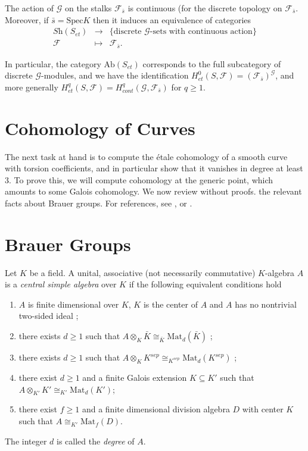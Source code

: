 \begin{theorem}
The action of $\mathcal{G}$ on the stalks $\mathcal{F}_{\bar s}$ is continuous 
(for the discrete topology on $\mathcal{F}_{\bar s}$. Moreover, if $\bar s= 
\text{Spec} K$ then it induces an equivalence of categories
$$
\begin{array}{rcl}
\textit{Sh}(S_{et}) & \longrightarrow & \{ \text{discrete $\mathcal{G}$-sets 
with continuous action} \} \\
\mathcal{F} & \longmapsto & \mathcal{F}_{\bar s}.
\end{array}
$$
\end{theorem}

\noindent
In particular, the category $\text{Ab}(S_{et})$ corresponds to the full 
subcategory of discrete $\mathcal{G}$-modules, and we have the identification 
$H_{et}^0(S,\mathcal{F}) = (\mathcal{F}_{\bar s})^\mathcal{G}$, and more 
generally $H_{et}^q(S,\mathcal{F}) = H_{cont}^q (\mathcal{G}, \mathcal{F}_{\bar 
s})$ for $q \geq 1$.


\section{Cohomology of Curves}
\label{section-cohomology-curves}

\noindent
The next task at hand is to compute the \'etale cohomology of a smooth curve 
with torsion coefficients, and in particular show that it vanishes in degree at 
least 3. To prove this, we will compute cohomology at the generic point, which 
amounts to some Galois cohomology. We now review without proofs. the relevant 
facts about Brauer groups. For references, see \cite{SerreCorpsLocaux}, 
\cite{SerreGaloisCohomology} or \cite{Weil}.

\section{Brauer Groups}

\begin{theorem} \label{defthm:CSA}
Let $K$ be a field. A unital, associative (not necessarily commutative) 
$K$-algebra $A$ is a \emph{central simple algebra} over $K$ if the following 
equivalent conditions hold
\begin{enumerate}
\item
$A$ is finite dimensional over $K$, $K$ is the center of $A$ and $A$ has no 
nontrivial two-sided ideal ;
\item
there exists $d \geq 1$ such that $A \otimes_K \bar K \cong_{\bar K} 
\text{Mat}_d(\bar K)$ ;
\item
there exists $d \geq 1$ such that $A \otimes_K K^{sep} \cong_{K^{sep}} 
\text{Mat}_d(K^{sep})$ ;
\item
there exist $d \geq 1$ and a finite Galois extension $K \subseteq K'$ such that 
$A \otimes_{K'} K' \cong_{K'} \text{Mat}_d(K')$; 
\item
there exist $f \geq 1$ and a finite dimensional division algebra $D$ with 
center $K$ such that $A \cong_{K'} \text{Mat}_f(D)$.
\end{enumerate}
The integer $d$ is called the \emph{degree} of $A$. 
\end{theorem}

